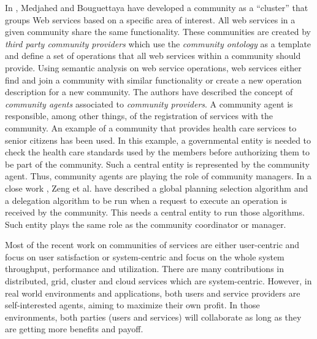 \documentclass[10pt,journal,cspaper,compsoc]{IEEEtran}
\begin{document}
In \cite{Medjahed05adynamic}, Medjahed and Bouguettaya have
developed a community as a ``cluster'' that groups Web services
based on a specific area of interest. All web services in a given
community share the same functionality. These communities are
created by \emph{third party community providers} which use the
\emph{community ontology} as a template and define a set of
operations that all web services within a community should
provide. Using semantic analysis on web service operations, web
services either find and join a community with similar
functionality or create a new operation description for a new
community. The authors have described the concept of
\emph{community agents} associated to \emph{community providers}.
A community agent is responsible, among other things, of the
registration of services with the community. An example of a
community that provides health care services to senior citizens
has been used. In this example, a governmental entity is needed to
check the health care standards used by the members before
authorizing them to be part of the community. Such a central
entity is represented by the community agent. Thus, community
agents are playing the role of community managers. In a close work
\cite{Zeng:2003:QDW:775152.775211}, Zeng et al. have described a
global planning selection algorithm and a delegation algorithm to
be run when a request to execute an operation is received by the
community. This needs a central entity to run those algorithms.
Such entity plays the same role as the community coordinator or
manager.

Most of the recent work on communities of services are either
user-centric and focus on user satisfaction
\cite{Chun02user-centricperformance} or system-centric and focus
on the whole system throughput, performance and utilization. There
are many contributions in distributed, grid, cluster and cloud
services which are system-centric. However, in real world
environments and applications, both users and service providers
are self-interested agents, aiming to maximize their own profit.
In those environments, both parties (users and services) will
collaborate as long as they are getting more benefits and payoff.
\end{document}

